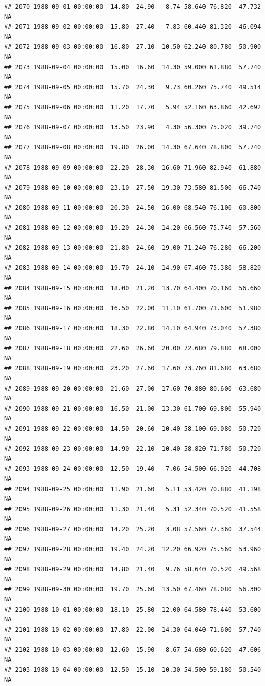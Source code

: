 \documentclass{article}\usepackage{graphicx, color}
\makeatletter
\newenvironment{kframe}{%
 \def\at@end@of@kframe{}%
 \ifinner\ifhmode%
  \def\at@end@of@kframe{\end{minipage}}%
  \begin{minipage}{\columnwidth}%
 \fi\fi%
 \def\FrameCommand##1{\hskip\@totalleftmargin \hskip-\fboxsep
 \colorbox{shadecolor}{##1}\hskip-\fboxsep
     \hskip-\linewidth \hskip-\@totalleftmargin \hskip\columnwidth}%
 \MakeFramed {\advance\hsize-\width
   \@totalleftmargin\z@ \linewidth\hsize
   \@setminipage}}%
 {\par\unskip\endMakeFramed%
 \at@end@of@kframe}
\newenvironment{knitrout}{}{} %
\makeatother
\begin{document}
\begin{knitrout}
\begin{kframe}
\begin{verbatim}
## 2070 1988-09-01 00:00:00  14.80  24.90   8.74 58.640 76.820  47.732     NA
## 2071 1988-09-02 00:00:00  15.80  27.40   7.83 60.440 81.320  46.094     NA
## 2072 1988-09-03 00:00:00  16.80  27.10  10.50 62.240 80.780  50.900     NA
## 2073 1988-09-04 00:00:00  15.00  16.60  14.30 59.000 61.880  57.740     NA
## 2074 1988-09-05 00:00:00  15.70  24.30   9.73 60.260 75.740  49.514     NA
## 2075 1988-09-06 00:00:00  11.20  17.70   5.94 52.160 63.860  42.692     NA
## 2076 1988-09-07 00:00:00  13.50  23.90   4.30 56.300 75.020  39.740     NA
## 2077 1988-09-08 00:00:00  19.80  26.00  14.30 67.640 78.800  57.740     NA
## 2078 1988-09-09 00:00:00  22.20  28.30  16.60 71.960 82.940  61.880     NA
## 2079 1988-09-10 00:00:00  23.10  27.50  19.30 73.580 81.500  66.740     NA
## 2080 1988-09-11 00:00:00  20.30  24.50  16.00 68.540 76.100  60.800     NA
## 2081 1988-09-12 00:00:00  19.20  24.30  14.20 66.560 75.740  57.560     NA
## 2082 1988-09-13 00:00:00  21.80  24.60  19.00 71.240 76.280  66.200     NA
## 2083 1988-09-14 00:00:00  19.70  24.10  14.90 67.460 75.380  58.820     NA
## 2084 1988-09-15 00:00:00  18.00  21.20  13.70 64.400 70.160  56.660     NA
## 2085 1988-09-16 00:00:00  16.50  22.00  11.10 61.700 71.600  51.980     NA
## 2086 1988-09-17 00:00:00  18.30  22.80  14.10 64.940 73.040  57.380     NA
## 2087 1988-09-18 00:00:00  22.60  26.60  20.00 72.680 79.880  68.000     NA
## 2088 1988-09-19 00:00:00  23.20  27.60  17.60 73.760 81.680  63.680     NA
## 2089 1988-09-20 00:00:00  21.60  27.00  17.60 70.880 80.600  63.680     NA
## 2090 1988-09-21 00:00:00  16.50  21.00  13.30 61.700 69.800  55.940     NA
## 2091 1988-09-22 00:00:00  14.50  20.60  10.40 58.100 69.080  50.720     NA
## 2092 1988-09-23 00:00:00  14.90  22.10  10.40 58.820 71.780  50.720     NA
## 2093 1988-09-24 00:00:00  12.50  19.40   7.06 54.500 66.920  44.708     NA
## 2094 1988-09-25 00:00:00  11.90  21.60   5.11 53.420 70.880  41.198     NA
## 2095 1988-09-26 00:00:00  11.30  21.40   5.31 52.340 70.520  41.558     NA
## 2096 1988-09-27 00:00:00  14.20  25.20   3.08 57.560 77.360  37.544     NA
## 2097 1988-09-28 00:00:00  19.40  24.20  12.20 66.920 75.560  53.960     NA
## 2098 1988-09-29 00:00:00  14.80  21.40   9.76 58.640 70.520  49.568     NA
## 2099 1988-09-30 00:00:00  19.70  25.60  13.50 67.460 78.080  56.300     NA
## 2100 1988-10-01 00:00:00  18.10  25.80  12.00 64.580 78.440  53.600     NA
## 2101 1988-10-02 00:00:00  17.80  22.00  14.30 64.040 71.600  57.740     NA
## 2102 1988-10-03 00:00:00  12.60  15.90   8.67 54.680 60.620  47.606     NA
## 2103 1988-10-04 00:00:00  12.50  15.10  10.30 54.500 59.180  50.540     NA

\end{verbatim}
\end{kframe}
\end{knitrout}
\end{document}
